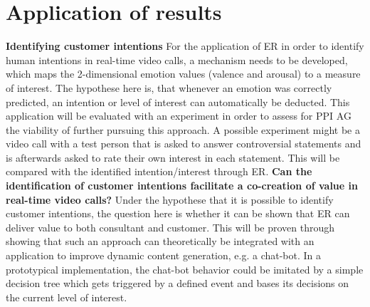 \documentclass[11pt,a4paper]{scrbook}
\begin{document}
\chapter{Application of results}
\textbf{Identifying customer intentions}\newline
For the application of \gls{ER} in order to identify human intentions in real-time video calls, a mechanism needs to be developed, which maps the 2-dimensional emotion values (valence and arousal) to a measure of interest. The hypothese here is, that whenever an emotion was correctly predicted, an intention or level of interest can automatically be deducted. This application will be evaluated with an experiment in order to assess for PPI AG the viability of further pursuing this approach. A possible experiment might be a video call with a test person that is asked to answer controversial statements and is afterwards asked to rate their own interest in each statement. This will be compared with the identified intention/interest through \gls{ER}.
\newline\newline
\textbf{Can the identification of customer intentions facilitate a co-creation of value in real-time video calls?}\newline
Under the hypothese that it is possible to identify customer intentions, the question here is whether it can be shown that \gls{ER} can deliver value to both consultant and customer. This will be proven through showing that such an approach can theoretically be integrated with an application to improve dynamic content generation, e.g. a chat-bot. In a prototypical implementation, the chat-bot behavior could be imitated by a simple decision tree which gets triggered by a defined event and bases its decisions on the current level of interest. 

\end{document}
